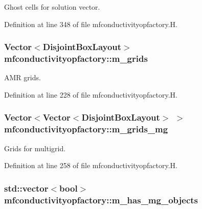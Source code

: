Ghost cells for solution vector. 



Definition at line 348 of file mfconductivityopfactory.\+H.

\subsubsection[{\texorpdfstring{m\+\_\+grids}{m_grids}}]{\setlength{\rightskip}{0pt plus 5cm}Vector$<$Disjoint\+Box\+Layout$>$ mfconductivityopfactory\+::m\+\_\+grids\hspace{0.3cm}{\ttfamily [protected]}}\hypertarget{classmfconductivityopfactory_a86838ee0b3579be00179ff3391185dd9}{}\label{classmfconductivityopfactory_a86838ee0b3579be00179ff3391185dd9}


A\+MR grids. 



Definition at line 228 of file mfconductivityopfactory.\+H.

\subsubsection[{\texorpdfstring{m\+\_\+grids\+\_\+mg}{m_grids_mg}}]{\setlength{\rightskip}{0pt plus 5cm}Vector$<$Vector$<$Disjoint\+Box\+Layout$>$ $>$ mfconductivityopfactory\+::m\+\_\+grids\+\_\+mg\hspace{0.3cm}{\ttfamily [protected]}}\hypertarget{classmfconductivityopfactory_a86db655fbf06804296551521af5fe3d3}{}\label{classmfconductivityopfactory_a86db655fbf06804296551521af5fe3d3}


Grids for multigrid. 



Definition at line 258 of file mfconductivityopfactory.\+H.

\subsubsection[{\texorpdfstring{m\+\_\+has\+\_\+mg\+\_\+objects}{m_has_mg_objects}}]{\setlength{\rightskip}{0pt plus 5cm}std\+::vector$<$bool$>$ mfconductivityopfactory\+::m\+\_\+has\+\_\+mg\+\_\+objects\hspace{0.3cm}{\ttfamily [protected]}}\hypertarget{classmfconductivityopfactory_a75240127a9d960617bf12b9fa9ce2d30}{}\label{classmfconductivityopfactory_a75240127a9d960617bf12b9fa9ce2d30}



